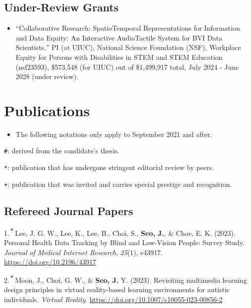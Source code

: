 \documentclass[11pt,a4paper,]{awesome-cv}
\providecommand{\tightlist}{%
	\setlength{\itemsep}{0pt}\setlength{\parskip}{0pt}}
\begin{document}
\hypertarget{under-review-grants}{%
  \subsection{Under-Review Grants}\label{under-review-grants}}

\begin{itemize}
  \tightlist
  \item
        ``Collaborative Research: SpatioTemporal Representations for
        Information and Data Equity: An Interactive AudioTactile System for
        BVI Data Scientists,'' PI (at UIUC), National Science Foundation
        (NSF), Workplace Equity for Persons with Disabilities in STEM and STEM
        Education (nsf23593), \$573,548 (for UIUC) out of \$1,499,917 total,
        July 2024 - June 2028 (under review).
\end{itemize}

\hypertarget{publications}{%
  \section{Publications}\label{publications}}

\begin{itemize}
  \tightlist
  \item
        The following notations only apply to September 2021 and after.
\end{itemize}

\texttt{\#}: derived from the candidate's thesis.

\texttt{*}: publication that has undergone stringent editorial review by
peers.

\texttt{+}: publication that was invited and carries special prestige
and recognition.

\hypertarget{refereed-journal-papers}{%
  \subsection{Refereed Journal Papers}\label{refereed-journal-papers}}

\hypertarget{bibliography}{}
\leavevmode\hypertarget{ref-leePersonalHealthData2023}{}%
1.\textsuperscript{\emph{\textbf{*}}} Lee, J. G. W., Lee, K., Lee, B.,
Choi, S., \textbf{Seo, J.}, \& Choe, E. K. (2023). Personal Health Data
Tracking by Blind and Low-Vision People: Survey Study. \emph{Journal of
  Medical Internet Research}, \emph{25}(1), e43917.
\url{https://doi.org/10.2196/43917}

\leavevmode\hypertarget{ref-moonRevisitingMultimediaLearning2023}{}%
2.\textsuperscript{\emph{\textbf{*}}} Moon, J., Choi, G. W., \&
\textbf{Seo, J.} Y. (2023). Revisiting multimedia learning design
principles in virtual reality-based learning environments for autistic
individuals. \emph{Virtual Reality}.
\url{https://doi.org/10.1007/s10055-023-00856-2}
\end{document}
